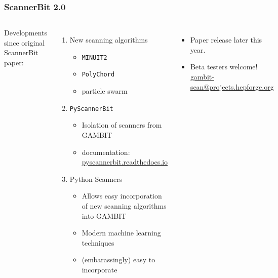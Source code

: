\documentclass[aspectratio=169]{beamer}
\begin{document}
\begin{frame}[fragile]
    \frametitle{ScannerBit 2.0}
    \begin{columns}
        Developments since original ScannerBit paper:
        \begin{enumerate}
            \item New scanning algorithms
                \begin{itemize}
                    \item \texttt{MINUIT2}
                    \item \texttt{PolyChord}
                    \item particle swarm
                \end{itemize}
            \item \texttt{PyScannerBit}
                \begin{itemize}
                    \item Isolation of scanners from GAMBIT
                    \item documentation: \href{https://pyscannerbit.readthedocs.io}{pyscannerbit.readthedocs.io}
                \end{itemize}
            \item Python Scanners
                \begin{itemize}
                    \item Allows easy incorporation of new scanning algorithms into GAMBIT
                    \item Modern machine learning techniques
                    \item (embarassingly) easy to incorporate
                \end{itemize}
        \end{enumerate}
        \begin{itemize}
            \item Paper release later this year.
            \item Beta testers welcome! \tiny{\href{mailto:gambit-scan@projects.hepforge.org}{gambit-scan@projects.hepforge.org}}
        \end{itemize}
\begin{lstlisting}[language=Python]
"""Grid scanner with MPI."""
import scanner_plugin as splug
from utils import MPI
import numpy as np

class Grid(splug.scanner):

    __version__="1.0.0"


\end{lstlisting}
\end{columns}
\end{frame}
\end{document}
